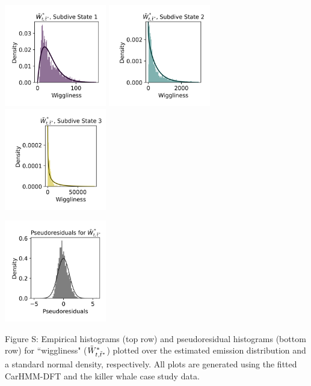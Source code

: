 \documentclass{article}
\begin{document}
        \begin{center}
        \includegraphics[width=1.75in]{../Plots/2019/20190902-182840-CATs_OB_1_0_267_CarHMM_empirical_hist_ahat_0.png}
        \includegraphics[width=1.75in]{../Plots/2019/20190902-182840-CATs_OB_1_0_267_CarHMM_empirical_hist_ahat_1.png}
        \includegraphics[width=1.75in]{../Plots/2019/20190902-182840-CATs_OB_1_0_267_CarHMM_empirical_hist_ahat_2.png}
        
        \includegraphics[width=1.75in]{../Plots/2019/20190902-182840-CATs_OB_1_0_267_CarHMM_pseudresids_ahat.png}
        \end{center}
        
        \noindent Figure S: Empirical histograms (top row) and pseudoresidual histograms (bottom row) for ``wiggliness" ($\tilde{W}^*_{t,\tilde t^*}$) plotted over the estimated emission distribution and a standard normal density, respectively. All plots are generated using the fitted CarHMM-DFT and the killer whale case study data.
        \addtocounter{fignum}{1}
        
\end{document}
